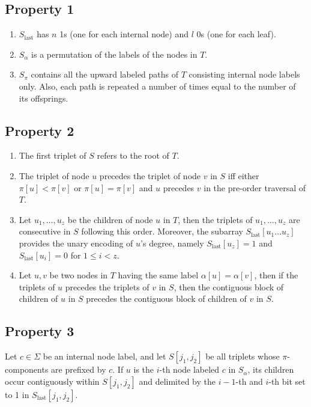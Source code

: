 \subsection{Property 1} \label{prop1}
\begin{enumerate}
    \item $S_{\text{last}}$ has $n$ 1s (one for each internal node) and $l$ 0s (one for each leaf).
    \item $S_{\alpha}$ is a permutation of the labels of the nodes in $T$.
    \item $S_{\pi}$ contains all the upward labeled paths of $T$ consisting internal node labels only. Also, each path is repeated a number of times equal to the number of its offsprings.
\end{enumerate}

\subsection{Property 2} \label{prop2}
\begin{enumerate}
    \item The first triplet of $S$ refers to the root of $T$.
    \item The triplet of node $u$ precedes the triplet of node $v$ in $S$ iff either $\pi[u] < \pi[v]$ or $\pi[u] = \pi[v]$ and $u$ precedes $v$ in the pre-order traversal of $T$.
    \item Let $u_1, \dots, u_z$ be the children of node $u$ in $T$, then the triplets of $u_1, \dots, u_z$ are consecutive in $S$ following this order. Moreover, the subarray $S_{\text{last}}[u_1 \dots u_z]$ provides the unary encoding of $u$'s degree, namely $S_{\text{last}}[u_z] = 1$ and $S_{\text{last}}[u_i] = 0$ for $1 \leq i < z$.
    \item Let $u, v$ be two nodes in $T$ having the same label $\alpha[u] = \alpha[v]$, then if the triplets of $u$ precedes the triplets of $v$ in $S$, then the contiguous block of children of $u$ in $S$ precedes the contiguous block of children of $v$ in $S$. 
\end{enumerate}

\subsection{Property 3} \label{prop3}
Let $c \in \Sigma$ be an internal node label, and let $S[j_1, j_2]$ be all triplets whose $\pi$-components are prefixed by $c$. If $u$ is the $i$-th node labeled $c$ in $S_{\alpha}$, its children occur contiguously within $S[j_1, j_2]$ and delimited by the $i - 1$-th and $i$-th bit set to 1 in $S_{\text{last}}[j_1, j_2]$.

